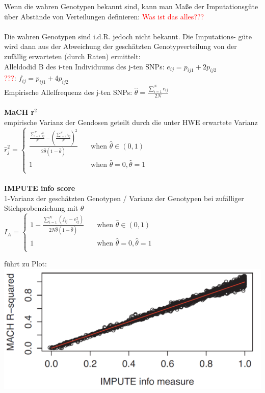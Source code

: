 Wenn die wahren Genotypen bekannt sind, kann man Maße der
Imputationsgüte über Abstände von Verteilungen definieren:
\textcolor{red}{Was ist das alles???}
\\\\
Die wahren Genotypen sind i.d.R. jedoch nicht bekannt. Die Imputations-
güte wird dann aus der Abweichung der geschätzten Genotypverteilung
von der zufällig erwarteten (durch Raten) ermittelt:\\
Alleldodid B des i-ten Individuums des j-ten SNPs: $e_{ij}=p_{ij1}+2p_{ij2}$\\
\textcolor{red}{???}: $f_{ij}=p_{ij1}+4p_{ij2}$\\
Empirische Allelfrequenz des j-ten SNPs: $\hat{\theta}=\frac{\sum_{i=1}^{N}e_{ij}}{2N}$
\\\\
\textbf{MaCH r$^2$}\\
empirische Varianz der Gendosen geteilt durch die unter HWE erwartete Varianz\\
$\hat{r}^2_j=
\begin{cases}
    \frac{\frac{\sum_{i=1}^{N}e^2_{ij}}{N} - (\frac{\sum_{i=1}^{N}e_{ij}}{N})^2}{2\hat{\theta}(1-\hat{\theta})}  & \quad \text{when } \hat{\theta} \in (0,1)\\
    1  & \quad \text{when } \hat{\theta}=0, \hat{\theta}=1\\
\end{cases}
$
\\\\
\textbf{IMPUTE info score}\\
1-Varianz der geschätzten Genotypen / Varianz der Genotypen bei zufälliger Stichprobenziehung mit $\theta$\\
$
I_A=
\begin{cases}
    1 - \frac{\sum_{i=1}^{N}(f_{ij}-e^2_{ij})}{2N\hat{\theta}(1-\hat{\theta})} & \quad \text{when } \hat{\theta} \in (0,1)\\
    1  & \quad \text{when } \hat{\theta}=0, \hat{\theta}=1\\
\end{cases}
$

führt zu Plot:\\
\includegraphics[width=1\textwidth]{lectures/V14/pix/machr_ia_plot.png}

